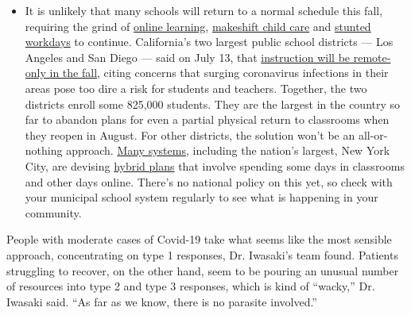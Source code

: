 \begin{itemize}
  \begin{itemize}
  \tightlist
  \item
    It is unlikely that many schools will return to a normal schedule
    this fall, requiring the grind of
    \href{https://www.nytimes.com/2020/06/05/us/coronavirus-education-lost-learning.html?action=click\&pgtype=Article\&state=default\&region=MAIN_CONTENT_3\&context=storylines_faq}{online
    learning},
    \href{https://www.nytimes.com/2020/05/29/us/coronavirus-child-care-centers.html?action=click\&pgtype=Article\&state=default\&region=MAIN_CONTENT_3\&context=storylines_faq}{makeshift
    child care} and
    \href{https://www.nytimes.com/2020/06/03/business/economy/coronavirus-working-women.html?action=click\&pgtype=Article\&state=default\&region=MAIN_CONTENT_3\&context=storylines_faq}{stunted
    workdays} to continue. California's two largest public school
    districts --- Los Angeles and San Diego --- said on July 13, that
    \href{https://www.nytimes.com/2020/07/13/us/lausd-san-diego-school-reopening.html?action=click\&pgtype=Article\&state=default\&region=MAIN_CONTENT_3\&context=storylines_faq}{instruction
    will be remote-only in the fall}, citing concerns that surging
    coronavirus infections in their areas pose too dire a risk for
    students and teachers. Together, the two districts enroll some
    825,000 students. They are the largest in the country so far to
    abandon plans for even a partial physical return to classrooms when
    they reopen in August. For other districts, the solution won't be an
    all-or-nothing approach.
    \href{https://bioethics.jhu.edu/research-and-outreach/projects/eschool-initiative/school-policy-tracker/}{Many
    systems}, including the nation's largest, New York City, are
    devising
    \href{https://www.nytimes.com/2020/06/26/us/coronavirus-schools-reopen-fall.html?action=click\&pgtype=Article\&state=default\&region=MAIN_CONTENT_3\&context=storylines_faq}{hybrid
    plans} that involve spending some days in classrooms and other days
    online. There's no national policy on this yet, so check with your
    municipal school system regularly to see what is happening in your
    community.
  \end{itemize}
\end{itemize}

People with moderate cases of Covid-19 take what seems like the most
sensible approach, concentrating on type 1 responses, Dr. Iwasaki's team
found. Patients struggling to recover, on the other hand, seem to be
pouring an unusual number of resources into type 2 and type 3 responses,
which is kind of ``wacky,'' Dr. Iwasaki said. ``As far as we know, there
is no parasite involved.''

